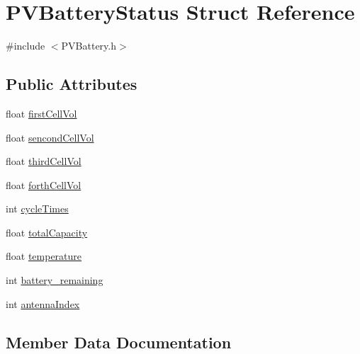 \hypertarget{struct_p_v_battery_status}{}\section{P\+V\+Battery\+Status Struct Reference}
\label{struct_p_v_battery_status}


{\ttfamily \#include $<$P\+V\+Battery.\+h$>$}

\subsection*{Public Attributes}
\begin{DoxyCompactItemize}
\item 
float \hyperlink{struct_p_v_battery_status_a96dec10be566c1bc1c7271aa72636451}{first\+Cell\+Vol}
\item 
float \hyperlink{struct_p_v_battery_status_ab240c8f6ef15e3874306b89a010ae77e}{sencond\+Cell\+Vol}
\item 
float \hyperlink{struct_p_v_battery_status_ad7a64175d8f011d629d218d22f207a27}{third\+Cell\+Vol}
\item 
float \hyperlink{struct_p_v_battery_status_a9391f787053cb237a8f545e6b5d3875e}{forth\+Cell\+Vol}
\item 
int \hyperlink{struct_p_v_battery_status_a0faa77c2b991015bf208a6e4c8a59404}{cycle\+Times}
\item 
float \hyperlink{struct_p_v_battery_status_af38dea628764fd8d319d4e23432f2905}{total\+Capacity}
\item 
float \hyperlink{struct_p_v_battery_status_ab5cd3f246a23f1be1c2f1cfbdb6dd7ef}{temperature}
\item 
int \hyperlink{struct_p_v_battery_status_a405b48f06a3a15f270f6c7488be6aa2d}{battery\+\_\+remaining}
\item 
int \hyperlink{struct_p_v_battery_status_aa51a70645653a076e0faaf0d1f5544de}{antenna\+Index}
\end{DoxyCompactItemize}


\subsection{Member Data Documentation}
\mbox{\label{struct_p_v_battery_status_aa51a70645653a076e0faaf0d1f5544de}} 
